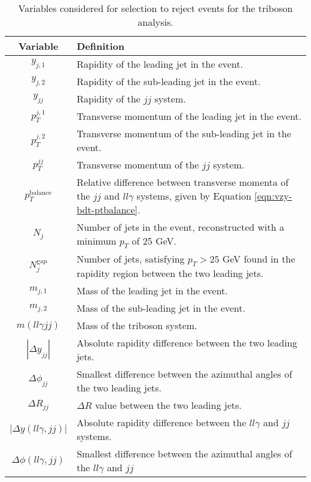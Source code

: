 \newcommand\ptbalance{\ensuremath{p_T^\text{balance}}\xspace}

\begin{table}[!p]
  \centering
  \renewcommand\arraystretch{1.3}
  \caption{
    Variables considered for selection to reject \QCDZy events for the
    \VZy triboson analysis.
  }
  \begin{tabular}{c|p{10cm}}
    \hline\hline
    Variable & Definition \\
    \hline
    $y_{j,1}$ &
    Rapidity of the leading jet in the event.
    \\
    $y_{j,2}$ &
    Rapidity of the sub-leading jet in the event.
    \\
    $y_{jj}$ &
    Rapidity of the $jj$ system.
    \\
    $p_T^{j,1}$ &
    Transverse momentum of the leading jet in the event.
    \\
    $p_T^{j,2}$ &
    Transverse momentum of the sub-leading jet in the event.
    \\
    $p_T^{jj}$ &
    Transverse momentum of the $jj$ system.
    \\
    \ptbalance &
    Relative difference between transverse momenta of the $jj$ and $ll\gamma$
    systems, given by Equation \ref{eqn:vzy-bdt-ptbalance}.
    \\
    $N_j$ &
    Number of jets in the event, reconstructed with a minimum $p_T$ of 25 GeV.
    \\
    $N_j^\text{gap}$ &
    Number of jets, satisfying $p_T > 25$ GeV found in the rapidity region
    between the two leading jets.
    \\
    $m_{j,1}$ &
    Mass of the leading jet in the event.
    \\
    $m_{j,2}$ &
    Mass of the sub-leading jet in the event.
    \\
    $m(ll\gamma jj)$ &
    Mass of the triboson system.
    \\
    $|\Delta y_{jj}|$ &
    Absolute rapidity difference between the two leading jets.
    \\
    $\Delta\phi_{jj}$ &
    Smallest difference between the azimuthal angles of the two leading jets.
    \\
    $\Delta R_{jj}$ &
    $\Delta R$ value between the two leading jets.
    \\
    $|\Delta y(ll\gamma, jj)|$ &
    Absolute rapidity difference between the $ll\gamma$ and $jj$ systems.
    \\
    $\Delta\phi(ll\gamma, jj)$ &
    Smallest difference between the azimuthal angles of the $ll\gamma$ and $jj$

\end{tabular}
\end{table}
